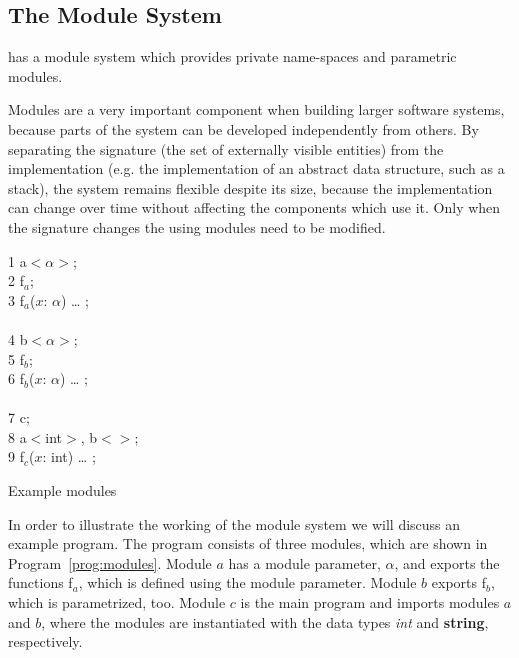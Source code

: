 \subsection{The Module System}
\label{sec:module-system}

\turtle{} has a module system which provides private name-spaces and
parametric modules.

Modules are a very important component when building larger software
systems, because parts of the system can be developed independently
from others.  By separating the signature (the set of externally
visible entities) from the implementation (e.g. the implementation
of an abstract data structure, such as a stack), the system remains
flexible despite its size, because the implementation can change over
time without affecting the components which use it.  Only when the
signature changes the using modules need to be modified.

\begin{Program}[htb]
\begin{ttlprog}
1\>\ttlModule{} a$<$$\alpha$$>$;\\
2\>\ttlExport{} f${}_a$;\\
3\>\ttlFun{} f${}_a$($x$: $\alpha$) \dots{} \ttlEnd{};\\
\\
4\>\ttlModule{} b$<$$\alpha$$>$;\\
5\>\ttlExport{} f${}_b$;\\
6\>\ttlFun{} f${}_b$($x$: $\alpha$) \dots{} \ttlEnd{};\\
\\
7\>\ttlModule{} c;\\
8\>\ttlImport{} a$<$int$>$, b$<$\ttlString{}$>$;\\
9\>\ttlFun{} f${}_c$($x$: int) \dots{} \ttlEnd{};
\end{ttlprog}
\caption{Example modules}
\label{prog:modules}
\end{Program}

In order to illustrate the working of the module system we will
discuss an example program.  The program consists of three modules,
which are shown in Program~\ref{prog:modules}.  Module $a$ has a
module parameter, $\alpha$, and exports the functions f${}_a$, which
is defined using the module parameter.  Module $b$ exports f${}_b$,
which is parametrized, too.  Module $c$ is the main program and
imports modules $a$ and $b$, where the modules are instantiated with
the data types {\em int} and {\bf string}, respectively.

